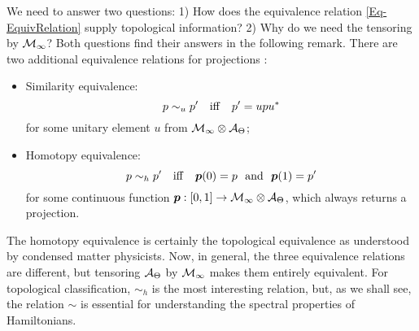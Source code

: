\documentclass[
    aps,
    prb,
    twocolumn,
    floatfix,
    superscriptaddress,
	10pt
]{revtex4-2}
\begin{document}
We need to answer two questions: 1) How does the equivalence relation \eqref{Eq-EquivRelation} supply topological information? 2) Why do we need the tensoring by ${\mathcal M}_\infty$? Both questions find their answers in the following remark. There are two additional equivalence relations for projections \cite[p.~18]{Park2008}:
\begin{itemize}
\item  Similarity equivalence:
\begin{equation}
p \sim_u p' \quad {\rm iff} \quad p'= u p u^\ast
\end{equation}
for some unitary element $u$ from ${\mathcal M}_\infty \otimes {\mathcal A}_\Theta$;
\item Homotopy equivalence:
\begin{equation}
p \sim_h p' \quad  {\rm iff} \quad \bm p(0)=p \ \  {\rm and} \ \  \bm p(1) = p'
\end{equation}
for some continuous function $\bm p : [0,1] \rightarrow {\mathcal M}_\infty \otimes {\mathcal A}_\Theta$, which always returns a projection. 
\end{itemize}
The homotopy equivalence is certainly the topological equivalence as understood by condensed matter physicists. Now, in general, the three equivalence relations are different, but 
tensoring ${\mathcal A}_\Theta$ by ${\mathcal M}_\infty$ makes them entirely equivalent. For topological classification, $\sim_h$ is the most interesting relation, but, as we shall see, the relation $\sim$ is essential for understanding the spectral properties of Hamiltonians. 

\vspace{0.2cm}
\end{document}
